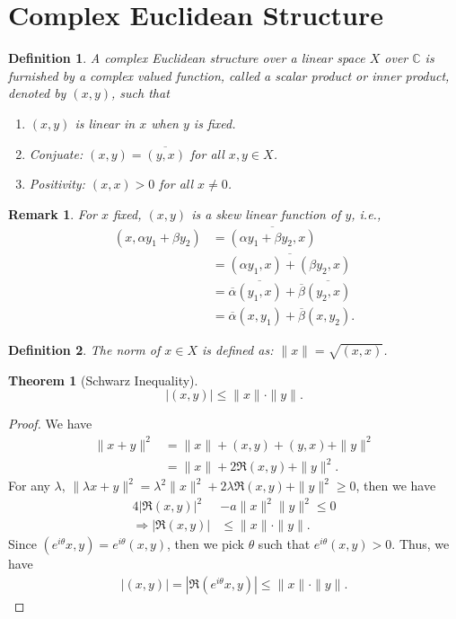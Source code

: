 \documentclass[11pt]{book}
\newtheorem{definition}{Definition}[section]
\newtheorem{theorem}{Theorem}[section]
\newtheorem{remark}{Remark}[section]
\theoremstyle{definition}
\numberwithin{equation}{subsection}
\begin{document}
\medskip

\section{Complex Euclidean Structure}

\begin{definition}
A complex Euclidean structure over a linear space $X$ over $\mathbb{C}$ is furnished by a complex valued function, called a scalar product or inner product, denoted by $(x,y)$, such that
\begin{enumerate}[label=(\arabic*)]
    \item $(x,y)$ is linear in $x$ when $y$ is fixed.
    \item Conjuate: $(x,y) = \overline{(y,x)}$ for all $x,y\in X$.
    \item Positivity: $(x,x) > 0$ for all $x\neq 0$.
\end{enumerate}
\end{definition}
\begin{remark}
For $x$ fixed, $(x, y)$ is a skew linear function of $y$, i.e.,
\begin{align*}
    (x, \alpha y_1 + \beta y_2) & = \overline{(\alpha y_1 + \beta y_2,x)} \\
    & = \overline{(\alpha y_1,x) + (\beta y_2,x)} \\
    & = \overline{\alpha} \overline{(y_1,x)} + \overline{\beta} \overline{(y_2,x)} \\
    & = \overline{\alpha}(x, y_1) + \overline{\beta}(x, y_2).
\end{align*}
\end{remark}

\medskip

\begin{definition}
The norm of $x\in X$ is defined as: $\|x\| = \sqrt{(x,x)}$.
\end{definition}

\medskip

\begin{theorem}[Schwarz Inequality]
$$|(x,y)|\leq \|x\|\cdot \|y\|.$$
\end{theorem}
\begin{proof}
We have 
\begin{align*}
    \|x+y\|^2 & = \|x\| + (x,y) + (y,x) + \|y\|^2 \\
    & = \|x\| + 2\Re (x,y) + \|y\|^2.
\end{align*}
For any $\lambda$, $\|\lambda x + y\|^2 = \lambda^2 \|x\|^2 + 2\lambda \Re (x,y) + \|y\|^2 \geq 0$, then we have
\begin{align*}
    4\left|\Re (x,y)\right|^2 & - a\|x\|^2 \|y\|^2 \leq 0 \\
    \Rightarrow \left|\Re (x,y)\right| & \leq \|x\|\cdot \|y\|. 
\end{align*}
Since $\left(e^{i\theta}x,y\right) = e^{i\theta}(x,y)$, then we pick $\theta$ such that $e^{i\theta}(x,y) > 0$. Thus, we have
\begin{align*}
    \left|(x,y)\right| = \left|\Re (e^{i\theta}x,y)\right| \leq \|x\|\cdot \|y\|.
\end{align*}
\end{proof}
\end{document}
